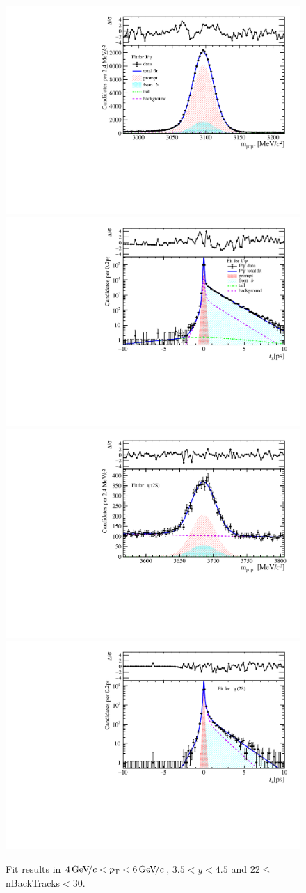 \begin{figure}[H]
\begin{center}
\includegraphics[width=0.47\linewidth]{pdf/Jpsi/drawmassB/n4y3pt3.pdf}
\includegraphics[width=0.47\linewidth]{pdf/Jpsi/2DFitB/n4y3pt3.pdf}
\vspace*{-0.5cm}
\includegraphics[width=0.47\linewidth]{pdf/Psi2S/drawmassB/n4y3pt3.pdf}
\includegraphics[width=0.47\linewidth]{pdf/Psi2S/2DFitB/n4y3pt3.pdf}
\vspace*{-0.5cm}
\end{center}
\caption{Fit results in $4\text{\,Ge\kern -0.1em V\!/}c<p_{\mathrm{T}}<6\text{\,Ge\kern -0.1em V\!/}c$, $3.5<y<4.5$ and 22$\leq$nBackTracks$<$30.}
\label{Fitn4y3pt3}
\end{figure}
